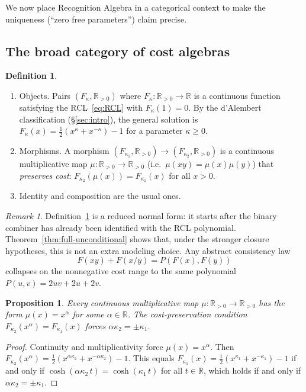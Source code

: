 \documentclass[11pt,reqno]{amsart}
\theoremstyle{plain}
\newtheorem{proposition}[theorem]{Proposition}
\theoremstyle{definition}
\newtheorem{definition}[theorem]{Definition}
\theoremstyle{remark}
\newtheorem{remark}[theorem]{Remark} %
\newcommand{\RR}{\mathbb{R}}
\newcommand{\1}{\mathbf{1}}
\begin{document}
We now place Recognition Algebra in a categorical context to make the
uniqueness (``zero free parameters'') claim precise. \subsection{The broad category of cost algebras}
\begin{definition}\label{def:costcat}
\begin{enumerate}[label=(\alph*),nosep]
\item Objects. Pairs $(F_\kappa,\RR_{>0})$ where $F_\kappa:\RR_{>0}\to\RR$ is a continuous function satisfying the RCL~\eqref{eq:RCL} with $F_\kappa(1)=0$. By the d'Alembert classification (\S\ref{sec:intro}), the general solution is $F_\kappa(x)=\tfrac12(x^\kappa+x^{-\kappa})-1$ for a parameter $\kappa\ge0$.
\item Morphisms. A morphism $(F_{\kappa_1},\RR_{>0})\to(F_{\kappa_2},\RR_{>0})$ is a continuous multiplicative map $\mu:\RR_{>0}\to\RR_{>0}$ (i.e.\ $\mu(xy)=\mu(x)\mu(y)$) that \emph{preserves cost}: $F_{\kappa_2}(\mu(x))=F_{\kappa_1}(x)$ for all $x>0$.
\item Identity and composition are the usual ones.
\end{enumerate}
\end{definition} 

{\color{paperblue}
\begin{remark}\label{rem:costcat-reduced}
Definition~\ref{def:costcat} is a reduced normal form: it starts after the binary combiner has already
been identified with the RCL polynomial. Theorem~\ref{thm:full-unconditional} shows that, under the
stronger closure hypotheses, this is not an extra modeling choice. Any abstract consistency law
\[
F(xy)+F(x/y)=P(F(x),F(y))
\]
collapses on the nonnegative cost range to the same polynomial \(P(u,v)=2uv+2u+2v\).
\end{remark}
}

\begin{proposition}\label{prop:morph}
Every continuous multiplicative map $\mu:\RR_{>0}\to\RR_{>0}$ has
the form $\mu(x)=x^\alpha$ for some $\alpha\in\RR$. The
cost-preservation condition
$F_{\kappa_2}(x^\alpha)=F_{\kappa_1}(x)$ forces
$\alpha\kappa_2=\pm\kappa_1$.
\end{proposition}

\begin{proof}
Continuity and multiplicativity force $\mu(x)=x^\alpha$. Then
$F_{\kappa_2}(x^\alpha)
=\tfrac12(x^{\alpha\kappa_2}+x^{-\alpha\kappa_2})-1$.
This equals
$F_{\kappa_1}(x)=\tfrac12(x^{\kappa_1}+x^{-\kappa_1})-1$
if and only if $\cosh(\alpha\kappa_2\, t)=\cosh(\kappa_1\, t)$ for
all $t\in\RR$, which holds if and only if
$\alpha\kappa_2=\pm\kappa_1$.
\end{proof}
\end{document}
